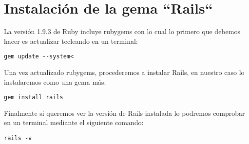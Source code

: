 \section{Instalación de la gema ``Rails``}
La versión 1.9.3 de Ruby incluye rubygems con lo cual lo primero que debemos hacer es actualizar tecleando en un terminal:
\begin{verbatim}
gem update --system<
\end{verbatim}
Una vez actualizado rubygems, procederemos a instalar Rails, en nuestro caso lo instalaremos como una gema más:
\begin{verbatim}
gem install rails
\end{verbatim}
Finalmente si queremos ver la versión de Rails instalada lo podremos comprobar en un terminal mediante el siguiente comando:
\begin{verbatim}
rails -v
\end{verbatim}
